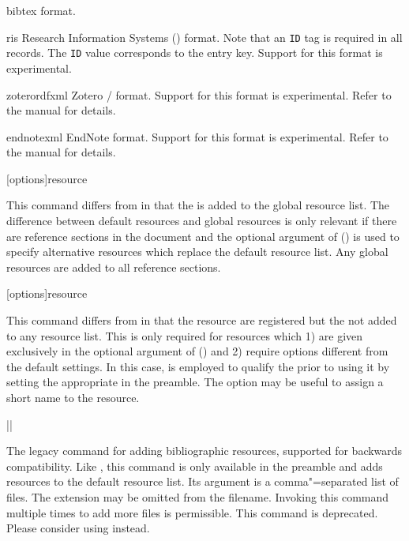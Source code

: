 \begin{ltxsyntax}
\begin{optionlist*}
\begin{valuelist}[zoterordfxml]
\item[bibtex] \bibtex format.

\item[ris]\BiberOnlyMark Research Information Systems () format. Note that an \texttt{ID} tag is required in all  records. The \texttt{ID} value corresponds to the entry key. Support for this format is experimental.

\item[zoterordfxml]\BiberOnlyMark Zotero / format. Support for this format is experimental. Refer to the \biber manual for details.

\item[endnotexml]\BiberOnlyMark EndNote  format. Support for this format is experimental. Refer to the \biber manual for details.

\end{valuelist}

\end{optionlist*}

[options]{resource}

This command differs from  in that the  is added to the global resource list. The difference between default resources and global resources is only relevant if there are reference sections in the document and the optional argument of  () is used to specify alternative resources which replace the default resource list. Any global resources are added to all reference sections.

[options]{resource}

This command differs from  in that the resource  are registered but the  not added to any resource list. This is only required for resources which 1) are given exclusively in the optional argument of  () and 2) require options different from the default settings. In this case,  is employed to qualify the  prior to using it by setting the appropriate  in the preamble. The  option may be useful to assign a short name to the resource.

|\DeprecatedMark|

The legacy command for adding bibliographic resources, supported for backwards compatibility. Like , this command is only available in the preamble and adds resources to the default resource list. Its argument is a comma"=separated list of  files. The  extension may be omitted from the filename. Invoking this command multiple times to add more files is permissible. This command is deprecated. Please consider using  instead.


\end{ltxsyntax}
